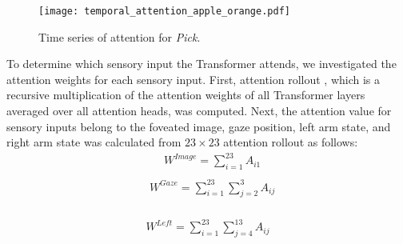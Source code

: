 \documentclass[letterpaper, 10 pt, conference]{ieeeconf}  %
\renewcommand\hl[1]{#1} %
\begin{document}
\begin{figure}
  \centering
  \texttt{[image: temporal\_attention\_apple\_orange.pdf]}
  \captionsetup{justification=centering}
  \caption{\hl{Time series of attention for \textit{Pick}.}}
  \label{fig:apple_orange_temporal_attention}
 \end{figure}


To determine which sensory input the Transformer attends, we investigated the attention weights for each sensory input.
First, attention rollout \cite{abnar2020quantifying}, which is a recursive multiplication of the attention weights of all Transformer layers averaged over all attention heads, was computed. \hl{Next, the attention value for sensory inputs belong to the foveated image, gaze position, left arm state, and right arm state was calculated from $23 \times 23$ attention rollout as follows:} 
\begin{equation}
\begin{aligned}
\label{eq:summed}
&W^{Image} = \sum^{23}_{i=1} A_{i1}\\
\end{aligned}
\end{equation}
\begin{equation}
\begin{aligned}
\label{eq:summed}
&W^{Gaze} = \sum^{23}_{i=1} \sum^{3}_{j=2} A_{ij}\\
\end{aligned}
\end{equation}

\begin{equation}
\begin{aligned}
\label{eq:summed}
W^{Left} = \sum^{23}_{i=1}\sum^{13}_{j=4} A_{ij}\\
\end{aligned}
\end{equation}
\end{document}
